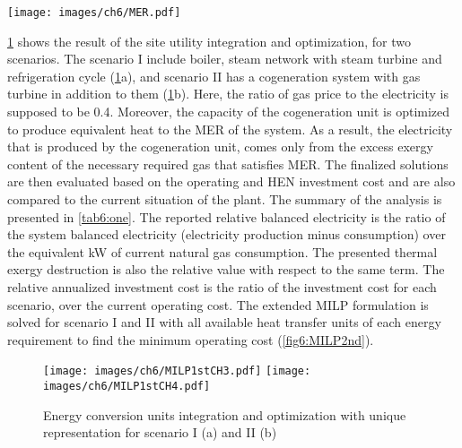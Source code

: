 \begin{figure*}[!ht]
\vspace{2mm}
\centering
\texttt{[image: images/ch6/MER.pdf]} 
\caption{Site Composite and Grand Composite Curves with unique representation of energy requirement}
\label{fig6:mer}
\end{figure*}
\vspace{5mm}


\cref{fig6:MILP1st} shows the result of the site utility integration and optimization, for two scenarios. The scenario I include boiler, steam network with steam turbine and refrigeration cycle (\cref{fig6:MILP1st}a), and scenario II has a cogeneration system with gas turbine in addition to them (\cref{fig6:MILP1st}b). Here, the ratio of gas price to the electricity is supposed to be 0.4. Moreover, the capacity of the cogeneration unit is optimized to produce equivalent heat to the MER of the system. As a result, the electricity that is produced by the cogeneration unit, comes only from the excess exergy content of the necessary required gas that satisfies MER. The finalized solutions are then evaluated based on the operating and HEN investment cost and are also compared to the current situation of the plant. The summary of the analysis is presented in \cref{tab6:one}. The reported relative balanced electricity is the ratio of the system balanced electricity (electricity production minus consumption) over the equivalent  kW of current natural gas consumption. The presented thermal exergy destruction is also the relative value with respect to the same term. The relative annualized investment cost is the ratio of the investment cost for each scenario, over the current operating cost. The extended MILP formulation is solved for scenario I and II with all available heat transfer units of each energy requirement to find the minimum operating cost (\cref{fig6:MILP2nd}). 


 \begin{figure}[!ht]
 \vspace{2mm}
 \begin{center}
 \texttt{[image: images/ch6/MILP1stCH3.pdf]}\quad
 \texttt{[image: images/ch6/MILP1stCH4.pdf]} 
 \caption{Energy conversion units integration and optimization with unique representation for scenario I (a) and II (b)} 
 \label{fig6:MILP1st}
 \end{center}
 \end{figure}

